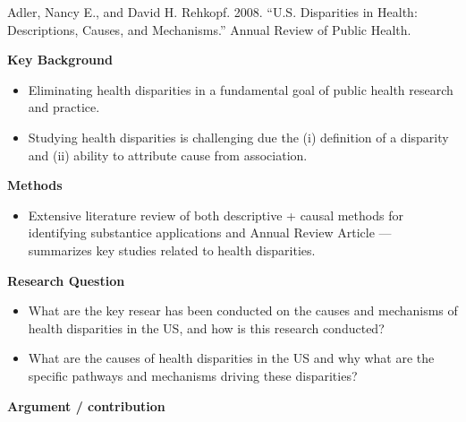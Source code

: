\documentclass[
]{book}
\providecommand{\tightlist}{%
  \setlength{\itemsep}{0pt}\setlength{\parskip}{0pt}}
\begin{document}
Adler, Nancy E., and David H. Rehkopf. 2008. ``U.S. Disparities in Health: Descriptions, Causes, and Mechanisms.'' Annual Review of Public Health.

\textbf{Key Background}

\begin{itemize}
\tightlist
\item
  Eliminating health disparities in a fundamental goal of public health research and practice.
\item
  Studying health disparities is challenging due the (i) definition of a disparity and (ii) ability to attribute cause from association.
\end{itemize}

\textbf{Methods}

\begin{itemize}
\tightlist
\item
  Extensive literature review of both descriptive + causal methods for identifying substantice applications and Annual Review Article --- summarizes key studies related to health disparities.
\end{itemize}

\textbf{Research Question}

\begin{itemize}
\tightlist
\item
  What are the key resear has been conducted on the causes and mechanisms of health disparities in the US, and how is this research conducted?
\item
  What are the causes of health disparities in the US and why what are the specific pathways and mechanisms driving these disparities?
\end{itemize}

\textbf{Argument / contribution}
\end{document}
